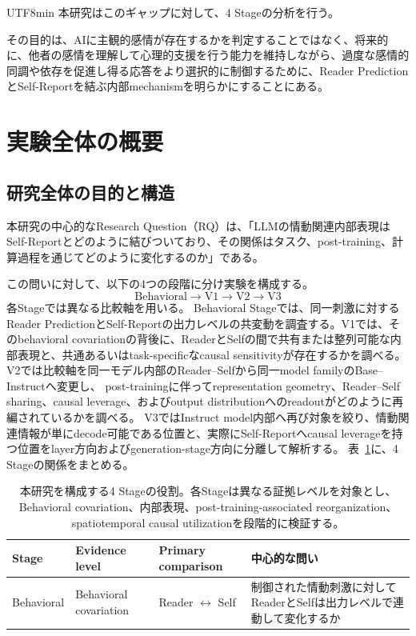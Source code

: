 \documentclass{article} %
\begin{document}
\begin{CJK*}{UTF8}{min}
本研究はこのギャップに対して、4 Stageの分析を行う。

その目的は、AIに主観的感情が存在するかを判定することではなく、将来的に、他者の感情を理解して心理的支援を行う能力を維持しながら、過度な感情的同調や依存を促進し得る応答をより選択的に制御するために、Reader PredictionとSelf-Reportを結ぶ内部mechanismを明らかにすることにある。

\section{実験全体の概要}
\label{app:overall_methods}
\subsection{研究全体の目的と構造}

本研究の中心的なResearch Question（RQ）は、「LLMの情動関連内部表現はSelf-Reportとどのように結びついており、その関係はタスク、post-training、計算過程を通じてどのように変化するのか」である。

この問いに対して、以下の4つの段階に分け実験を構成する。
\[
\text{Behavioral}
\rightarrow
\text{V1}
\rightarrow
\text{V2}
\rightarrow
\text{V3}
\]
各Stageでは異なる比較軸を用いる。
Behavioral Stageでは、同一刺激に対するReader PredictionとSelf-Reportの出力レベルの共変動を調査する。V1では、そのbehavioral covariationの背後に、ReaderとSelfの間で共有または整列可能な内部表現と、共通あるいはtask-specificなcausal sensitivityが存在するかを調べる。
V2では比較軸を同一モデル内部のReader--Selfから同一model familyのBase--Instructへ変更し、
post-trainingに伴ってrepresentation geometry、Reader--Self sharing、causal leverage、およびoutput distributionへのreadoutがどのように再編されているかを調べる。
V3ではInstruct model内部へ再び対象を絞り、情動関連情報が単にdecode可能である位置と、実際にSelf-Reportへcausal leverageを持つ位置をlayer方向およびgeneration-stage方向に分離して解析する。
表~\ref{tab:four_stage_overview}に、4 Stageの関係をまとめる。

\begin{table}[htbp]
\centering
\small
\caption{本研究を構成する4 Stageの役割。各Stageは異なる証拠レベルを対象とし、
Behavioral covariation、内部表現、post-training-associated reorganization、
spatiotemporal causal utilizationを段階的に検証する。}
\label{tab:four_stage_overview}
\begin{tabularx}{\linewidth}{
@{}
>{\raggedright\arraybackslash}p{1.4cm}
>{\raggedright\arraybackslash}p{2.4cm}
>{\raggedright\arraybackslash}p{2.7cm}
>{\raggedright\arraybackslash}X
@{}
}
\toprule
\textbf{Stage} &
\textbf{Evidence level} &
\textbf{Primary comparison} &
\textbf{中心的な問い} \\
\midrule
Behavioral &
Behavioral covariation &
Reader $\leftrightarrow$ Self &
制御された情動刺激に対してReaderとSelfは出力レベルで連動して変化するか \\


\end{tabularx}
\end{table}
\end{CJK*}
\end{document}
